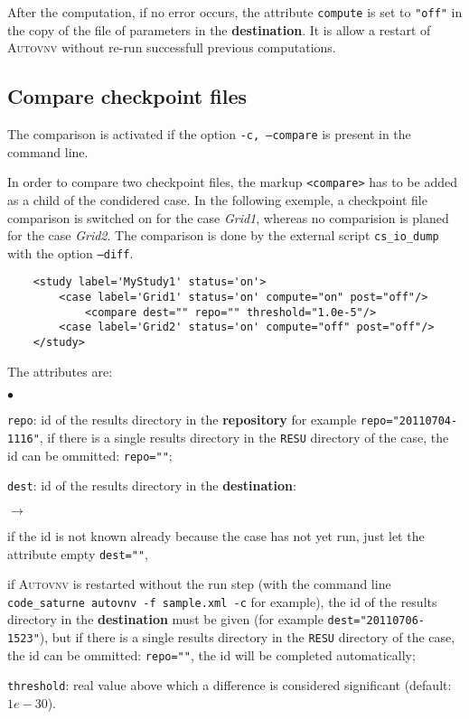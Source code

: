 \documentclass[a4paper,10pt,twoside]{article}
\begin{document}
After the computation, if no error occurs, the attribute \texttt{compute} is set to \texttt{"off"}
in the copy of the file of parameters in the \textbf{destination}. It is allow a restart
of \textsc{Autovnv} without re-run successfull previous computations.

\subsection{Compare checkpoint files}

The comparison is activated if the option \texttt{-c, --compare} is present in the command line.

In order to compare two checkpoint files, the markup \texttt{<compare>} has to be added as
a child of the condidered case. In the following exemple, a checkpoint file comparison
is switched on for the case \textit{Grid1}, whereas no comparision is planed for the case
\textit{Grid2}.
The comparison is done by the external script \texttt{cs\_io\_dump} with the option \texttt{--diff}.

\begin{verbatim}
    <study label='MyStudy1' status='on'>
        <case label='Grid1' status='on' compute="on" post="off"/>
            <compare dest="" repo="" threshold="1.0e-5"/>
        <case label='Grid2' status='on' compute="off" post="off"/>
    </study>
\end{verbatim}

The attributes are:
\begin{list}{$\bullet$}{}

\item \texttt{repo}: id of the results directory in the \textbf{repository} for example \texttt{repo="20110704-1116"},
if there is a single results directory in the \texttt{RESU} directory of the case, the id can be ommitted: \texttt{repo=""};

\item \texttt{dest}: id of the results directory in the \textbf{destination}:
\begin{list}{$\rightarrow$}{}
\item if the id is not known already because the case has not yet run, just let the attribute empty \texttt{dest=""},
\item if \textsc{Autovnv} is restarted without the run step (with the command line \texttt{code\_saturne
autovnv -f sample.xml -c} for example), the id of the results directory in
the \textbf{destination} must be given (for example \texttt{dest="20110706-1523"}), but if there is a single results directory in the \texttt{RESU} directory
of the case, the id can be ommitted: \texttt{repo=""}, the id will be completed automatically;
\end{list}

\item \texttt{threshold}: real value above which a difference is considered significant (default: $1e-30$).

\end{list}
\end{document}
